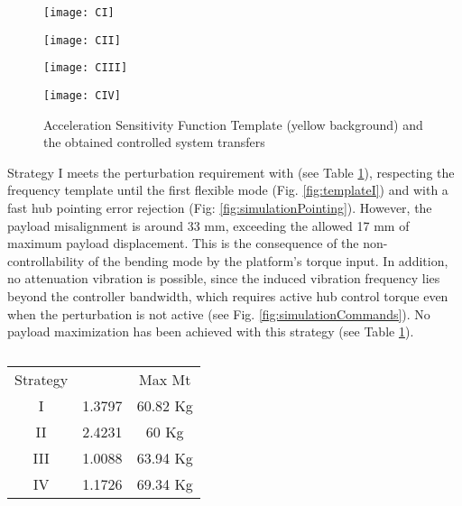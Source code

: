 \documentclass{ifacconf}
\begin{document}
\begin{figure*}[] 
  \begin{minipage}[b]{0.5\linewidth}
    \centering
    \texttt{[image: CI]}
     \label{fig:templateI}
  \end{minipage}\begin{minipage}[b]{0.5\linewidth}
    \centering
    \texttt{[image: CII]} 
 	\label{fig:templateII}
  \end{minipage} 
  \begin{minipage}[b]{0.5\linewidth}
    \centering
    \texttt{[image: CIII]} 
 \label{fig:templateIII}
  \end{minipage}\begin{minipage}[b]{0.5\linewidth}
    \centering
    \texttt{[image: CIV]} 
     \label{fig:templateIV}
  \end{minipage} 
  \caption{Acceleration Sensitivity Function Template (yellow background) and the obtained controlled system transfers}
  \label{fig:template} 
\end{figure*}

Strategy I meets the perturbation requirement with  (see Table \ref{tab:results}), respecting the frequency template until the first flexible mode (Fig. \ref{fig:templateI}) and with a fast hub pointing error rejection (Fig: \ref{fig:simulationPointing}). However, the payload misalignment is around 33 mm, exceeding the allowed 17 mm of maximum payload displacement. This is the consequence of the non-controllability of the bending mode by the platform's torque input. In addition, no attenuation vibration is possible, since the induced vibration frequency lies beyond the controller bandwidth, which requires active hub control torque even when the perturbation is not active (see Fig. \ref{fig:simulationCommands}). No payload maximization has been achieved with this strategy (see Table \ref{tab:results}).


\begin{table}
\caption{}
\begin{center}
\label{tab:results}
\begin{tabular}{c c c}
& & \\ \hline
\hline
Strategy &  & Max Mt \\
\hline
I & 1.3797 &  60.82 Kg\\
II & 2.4231 & 60 Kg\\
III & 1.0088 & 63.94 Kg \\
IV & 1.1726 & 69.34 Kg \\
\hline
\hline
\end{tabular}
\end{center}
\end{table}
\end{document}
